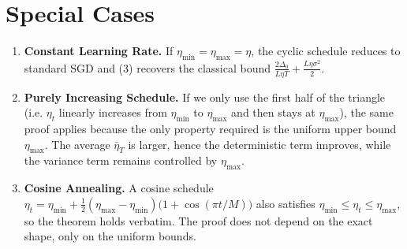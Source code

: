 \documentclass{article}
\begin{document}
\section*{Special Cases}
\begin{enumerate}[label=\alph*. , leftmargin=*]
\item \textbf{Constant Learning Rate.}  
If $\eta_{\min}=\eta_{\max}=\eta$, the cyclic schedule reduces to standard SGD
and (3) recovers the classical bound
$\frac{2\Delta_{0}}{L\eta T}+ \frac{L\eta\sigma^{2}}{2}$.

\item \textbf{Purely Increasing Schedule.}  
If we only use the first half of the triangle (i.e. $\eta_{t}$ linearly
increases from $\eta_{\min}$ to $\eta_{\max}$ and then stays at $\eta_{\max}$),
the same proof applies because the only property required is the uniform
upper bound $\eta_{\max}$.  The average $\bar\eta_{T}$ is larger,
hence the deterministic term improves, while the variance term remains
controlled by $\eta_{\max}$.

\item \textbf{Cosine Annealing.}  
A cosine schedule $\eta_{t}= \eta_{\min}+ \tfrac12(\eta_{\max}-\eta_{\min})
\bigl(1+\cos(\pi t/M)\bigr)$ also satisfies $ \eta_{\min}\le\eta_{t}\le\eta_{\max}$,
so the theorem holds verbatim.  The proof does not depend on the exact shape,
only on the uniform bounds.
\end{enumerate}
\end{document}
